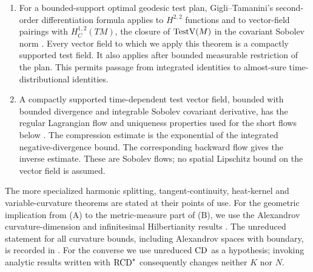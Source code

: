 \begin{enumerate}
\item For a bounded-support optimal geodesic test plan,
Gigli--Tamanini's second-order differentiation formula applies to
\(H^{2,2}\) functions and to vector-field pairings with
\(H_C^{1,2}(TM)\), the closure of \(\operatorname{TestV}(M)\) in the covariant
Sobolev norm \cite[Theorem~5.13]{GigliTamanini2021}.
Every vector field to which we apply this theorem is a compactly
supported test field.
It also applies after bounded measurable restriction of the
plan. This permits passage from integrated identities to
almost-sure time-distributional identities.

\item A compactly supported time-dependent test vector field,
bounded with bounded divergence and integrable Sobolev covariant
derivative, has the regular Lagrangian flow and uniqueness
properties used for the short flows below
\cite[Sections~8 and 9.6]{AmbrosioTrevisan2014}.
The compression estimate is the exponential of the integrated
negative-divergence bound. The corresponding backward flow gives
the inverse estimate. These are Sobolev flows; no spatial
Lipschitz bound on the vector field is assumed.
\end{enumerate}

The more specialized harmonic splitting, tangent-continuity,
heat-kernel and variable-curvature theorems are stated at their
points of use. For the geometric implication from \textup{(A)}
to the metric-measure part of \textup{(B)}, we use the Alexandrov
curvature-dimension and infinitesimal Hilbertianity results
\cite{Petrunin2011,ZhangZhu2010,KMS2001}. The unreduced statement
for all curvature bounds, including Alexandrov spaces with boundary,
is recorded in \cite[Theorem~2.9 and Corollary~2.10]{KapovitchKettererSturm}.
For the converse we use unreduced \(\mathrm{CD}\) as a hypothesis; invoking
analytic results written with \(\mathrm{RCD}^*\) consequently changes
neither \(K\) nor \(N\).
